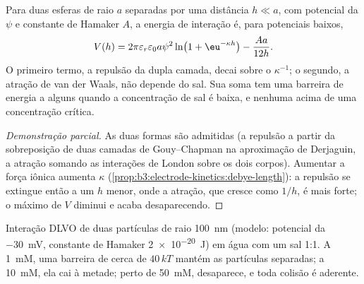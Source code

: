 \begin{theorem}\label{thm:b3:colloids:dlvo}
Para duas esferas de raio $a$ separadas por uma distância $h \ll a$, com potencial da 
$\psi$ e constante de Hamaker $A$, a energia de interação é, para potenciais baixos,
\[
  V(h) = 2\pi\varepsilon_r\varepsilon_0a\psi^2\ln\bigl(1 + \eu^{-\kappa h}\bigr) - \frac{Aa}{12h} .
\]
O primeiro termo, a repulsão da dupla camada, decai sobre o  $\kappa^{-1}$;
o segundo, a atração de van der Waals, não depende do sal. Sua soma tem uma barreira
de energia a alguns  quando a concentração de sal é baixa, e
nenhuma acima de uma concentração crítica.
\end{theorem}

\begin{proof}[Demonstração parcial]
As duas formas são admitidas (a repulsão a partir da sobreposição de duas camadas de
Gouy--Chapman na aproximação de Derjaguin, a atração somando as interações de London
sobre os dois corpos). Aumentar a força iônica aumenta $\kappa$
(\cref{prop:b3:electrode-kinetics:debye-length}): a repulsão se extingue então a um
$h$ menor, onde a atração, que cresce como $1/h$, é mais forte; o máximo de $V$
diminui e acaba desaparecendo.
\end{proof}

\begin{omfigure}

{\small Interação DLVO de duas partículas de raio \qty{100}{nm} (modelo: potencial da
 \qty{-30}{mV}, constante de Hamaker \qty{2e-20}{J}) em água com um sal 1:1.
A \qty{1}{mM}, uma barreira de cerca de $40\,kT$ mantém as partículas separadas; a
\qty{10}{mM}, ela cai à metade; perto de \qty{50}{mM}, desaparece, e toda colisão é aderente.}
\end{omfigure}

